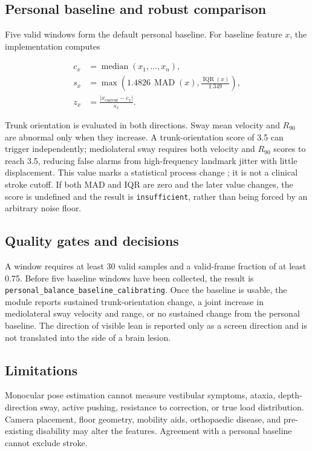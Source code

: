 \documentclass[11pt,a4paper]{article}
\begin{document}
\subsection{Personal baseline and robust comparison}

Five valid windows form the default personal baseline. For baseline feature $x$, the implementation computes

\begin{align}
c_x &= \operatorname{median}(x_1,\ldots,x_n), \\
s_x &= \max\left(1.4826\,\operatorname{MAD}(x),\frac{\operatorname{IQR}(x)}{1.349}\right), \\
z_x &= \frac{|x_{\mathrm{current}}-c_x|}{s_x}.
\end{align}

Trunk orientation is evaluated in both directions. Sway mean velocity and $R_{90}$ are abnormal only when they increase. A trunk-orientation score of 3.5 can trigger independently; mediolateral sway requires both velocity and $R_{90}$ scores to reach 3.5, reducing false alarms from high-frequency landmark jitter with little displacement. This value marks a statistical process change \cite{iglewicz1993outliers}; it is not a clinical stroke cutoff. If both MAD and IQR are zero and the later value changes, the score is undefined and the result is \texttt{insufficient}, rather than being forced by an arbitrary noise floor.

\subsection{Quality gates and decisions}

A window requires at least 30 valid samples and a valid-frame fraction of at least 0.75. Before five baseline windows have been collected, the result is \texttt{personal\_balance\_baseline\_calibrating}. Once the baseline is usable, the module reports sustained trunk-orientation change, a joint increase in mediolateral sway velocity and range, or no sustained change from the personal baseline. The direction of visible lean is reported only as a screen direction and is not translated into the side of a brain lesion.

\subsection{Limitations}

Monocular pose estimation cannot measure vestibular symptoms, ataxia, depth-direction sway, active pushing, resistance to correction, or true load distribution. Camera placement, floor geometry, mobility aids, orthopaedic disease, and pre-existing disability may alter the features. Agreement with a personal baseline cannot exclude stroke.
\end{document}
